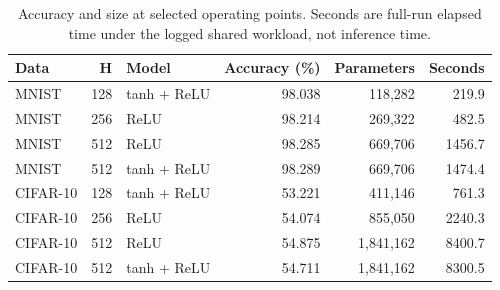 \begin{table}[htbp]
\centering
\caption{Accuracy and size at selected operating points. Seconds are full-run elapsed time under the logged shared workload, not inference time.}
\label{tab:cost}
\small
\begin{tabular}{@{}lrlrrr@{}}
\toprule
Data & H & Model & Accuracy (\%) & Parameters & Seconds \\
\midrule
MNIST & 128 & tanh + ReLU & 98.038 & 118,282 & 219.9 \\
MNIST & 256 & ReLU & 98.214 & 269,322 & 482.5 \\
MNIST & 512 & ReLU & 98.285 & 669,706 & 1456.7 \\
MNIST & 512 & tanh + ReLU & 98.289 & 669,706 & 1474.4 \\
CIFAR-10 & 128 & tanh + ReLU & 53.221 & 411,146 & 761.3 \\
CIFAR-10 & 256 & ReLU & 54.074 & 855,050 & 2240.3 \\
CIFAR-10 & 512 & ReLU & 54.875 & 1,841,162 & 8400.7 \\
CIFAR-10 & 512 & tanh + ReLU & 54.711 & 1,841,162 & 8300.5 \\
\bottomrule
\end{tabular}
\end{table}
